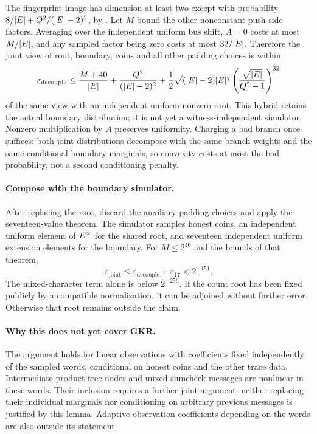 The fingerprint image has dimension at least two except with probability $8/|E|+Q^2/(|E|-2)^2$, by . Let $M$ bound the other nonconstant push-side factors. Averaging over the independent uniform bus shift, $A=0$ costs at most $M/|E|$, and any sampled factor being zero costs at most $32/|E|$. Therefore the joint view of root, boundary, coins and all other padding choices is within
\[
 \varepsilon_{\mathrm{decouple}}\le
 \frac{M+40}{|E|}+\frac{Q^2}{(|E|-2)^2}
 +\frac12\sqrt{(|E|-2)|E|^7}
 \left(\frac{\sqrt{|E|}}{Q^2-1}\right)^{32}
\]
of the same view with an independent uniform nonzero root. This hybrid retains the actual boundary distribution; it is not yet a witness-independent simulator. Nonzero multiplication by $A$ preserves uniformity. Charging a bad branch once suffices: both joint distributions decompose with the same branch weights and the same conditional boundary marginals, so convexity costs at most the bad probability, not a second conditioning penalty.

\paragraph{Compose with the boundary simulator.} After replacing the root, discard the auxiliary padding choices and apply the seventeen-value theorem. The simulator samples honest coins, an independent uniform element of $E^\times$ for the shared root, and seventeen independent uniform extension elements for the boundary. For $M\le2^{40}$ and the bounds of that theorem,
\[
 \varepsilon_{\mathrm{joint}}\le
 \varepsilon_{\mathrm{decouple}}+\varepsilon_{17}<2^{-151}.
\]
The mixed-character term alone is below $2^{-256}$. If the count root has been fixed publicly by a compatible normalization, it can be adjoined without further error. Otherwise that root remains outside the claim.

\paragraph{Why this does not yet cover GKR.} The argument holds for linear observations with coefficients fixed independently of the sampled words, conditional on honest coins and the other trace data. Intermediate product-tree nodes and mixed sumcheck messages are nonlinear in these words. Their inclusion requires a further joint argument; neither replacing their individual marginals nor conditioning on arbitrary previous messages is justified by this lemma. Adaptive observation coefficients depending on the words are also outside its statement.

